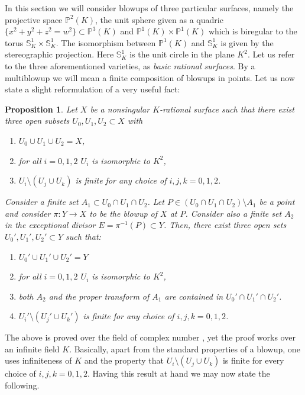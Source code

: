\documentclass[12pt,reqno]{amsart}   	%
\newtheorem{prop}[thm]{Proposition}
\theoremstyle{obs}
\theoremstyle{prob}
\theoremstyle{conj}
\theoremstyle{remark}
\begin{document}
In this section we will consider blowups of three particular surfaces, namely the projective space $\mathbb{P}^2(K)$, the unit sphere given as a quadric $\{x^2+y^2+z^2=w^2 \}\subset \mathbb{P}^3(K)$ and $\mathbb{P}^1(K) \times \mathbb{P}^1(K)$ which is biregular to the torus $\mathbb{S}_K^1\times \mathbb{S}_K^1$. The isomorphism between $\mathbb{P}^1(K)$ and $\mathbb{S}_K^1$ is given by the stereographic projection. Here $\mathbb{S}_K^1$ is the unit circle in the plane $K^2$. Let us refer to the three aforementioned varieties, as \textit{basic rational surfaces}. By a multiblowup we will mean a finite composition of blowups in points. Let us now state a slight reformulation of a very useful fact:
\begin{prop}\cite[Lemma 1.6]{cssv2023}
Let $X$ be a nonsingular $K$-rational surface such that there exist three open subsets $U_0,U_1,U_2 \subset X$ with 
\begin{enumerate}
\item $U_0\cup U_1\cup U_2 = X$,
\item for all $i=0,1,2$ $U_i$ is isomorphic to $K^2$,
\item $U_i \setminus (U_j\cup U_k)$ is finite for any choice of $i,j,k=0,1,2$.
\end{enumerate}
Consider a finite set $A_1 \subset U_0 \cap U_1 \cap U_2$. Let $P \in  (U_0 \cap U_1 \cap U_2) \setminus A_1$ be a point and consider $\pi : Y \rightarrow X$ to be the blowup of $X$ at $P$. Consider also a finite set $A_2$ in the exceptional divisor $E=\pi^{-1}(P) \subset Y$. Then, there exist three open sets $U_0',U_1',U_2'\subset Y$ such that:

\begin{enumerate}
\item $U_0'\cup U_1'\cup U_2'=Y$
\item for all $i=0,1,2$ $U_i$ is isomorphic to $K^2$,
\item both $A_2$ and the proper transform of $A_1$ are contained in $ U_0'\cap U_1'\cap U_2'$.
\item $U_i' \setminus (U_j'\cup U_k')$ is finite for any choice of $i,j,k=0,1,2$.

\end{enumerate}





\end{prop}
The above is proved over the field of complex number \cite{cssv2023}, yet the proof works over an infinite field $K$. Basically, apart from the standard properties of a blowup, one uses infiniteness of $K$ and the property that $U_i\setminus ( U_j\cup U_k)$ is finite for every choice of $i,j,k=0,1,2$. Having this result at hand we may now state the following.
\end{document}
